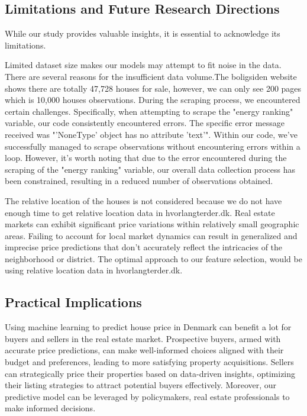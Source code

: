 \documentclass[12pt]{article} %
\begin{document}
{    \subsection{Limitations and Future Research Directions} 
    
    While our study provides valuable insights, it is essential to acknowledge its limitations. 
    
    Limited dataset size makes our models may attempt to fit noise in the data. There are several reasons for the insufficient data volume.The boligsiden website shows there are totally 47,728 houses for sale, however, we can only see 200 pages which is 10,000 houses observations. During the scraping process, we encountered certain challenges. Specifically, when attempting to scrape the "energy ranking" variable, our code consistently encountered errors. The specific error message received was "'NoneType' object has no attribute 'text'". Within our code, we've successfully managed to scrape observations without encountering errors within a loop. However, it's worth noting that due to the error encountered during the scraping of the "energy ranking" variable, our overall data collection process has been constrained, resulting in a reduced number of observations obtained.
    
    The relative location of the houses is not considered because we do not have enough time to get relative location data in hvorlangterder.dk. Real estate markets can exhibit significant price variations within relatively small geographic areas. Failing to account for local market dynamics can result in generalized and imprecise price predictions that don't accurately reflect the intricacies of the neighborhood or district. The optimal approach to our feature selection, would be using relative location data in hvorlangterder.dk.
    


    \subsection{Practical Implications}
    
    Using machine learning to predict house price in Denmark can benefit a lot for buyers and sellers in the real estate market. Prospective buyers, armed with accurate price predictions, can make well-informed choices aligned with their budget and preferences, leading to more satisfying property acquisitions. Sellers can strategically price their properties based on data-driven insights, optimizing their listing strategies to attract potential buyers effectively. Moreover, our predictive model can be leveraged by policymakers, real estate professionals to make informed decisions. 

}
\end{document}
